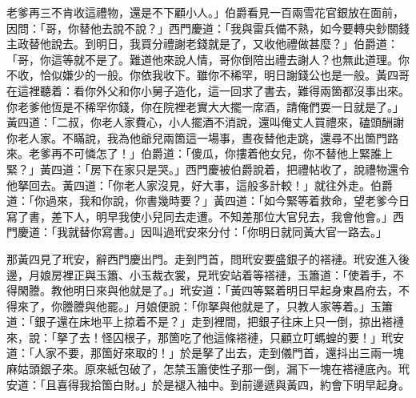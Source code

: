 老爹再三不肯收這禮物，還是不下顧小人。」伯爵看見一百兩雪花官銀放在面前，因問：「哥，你替他去說不說？」西門慶道：「我與雷兵備不熟，如今要轉央鈔關錢主政替他說去。到明日，我買分禮謝老錢就是了，又收他禮做甚麼？」伯爵道：「哥，你這等就不是了。難道他來說人情，哥你倒陪出禮去謝人？也無此道理。你不收，恰似嫌少的一般。你依我收下。雖你不稀罕，明日謝錢公也是一般。黃四哥在這裡聽着：看你外父和你小舅子造化，這一回求了書去，難得兩箇都沒事出來。你老爹他恆是不稀罕你錢，你在院裡老實大大擺一席酒，請俺們耍一日就是了。」{}黃四道：「二叔，你老人家費心，小人擺酒不消說，還叫俺丈人買禮來，磕頭酬謝你老人家。不瞞說，我為他爺兒兩箇這一場事，晝夜替他走跳，還尋不出箇門路來。老爹再不可憐怎了！」伯爵道：「傻瓜，你摟着他女兒，你不替他上緊誰上緊？」{}黃四道：「房下在家只是哭。」西門慶被伯爵說着，把禮帖收了，說禮物還令他拏回去。{}黃四道：「你老人家沒見，好大事，這般多計較！」就往外走。伯爵道：「你過來，我和你說，你書幾時要？」黃四道：「如今緊等着救命，望老爹今日寫了書，差下人，明早我使小兒同去走遭。不知差那位大官兒去，我會他會。」西門慶道：「我就替你寫書。」因叫過玳安來分付：「你明日就同黃大官一路去。」

那黃四見了玳安，辭西門慶出門。走到門首，問玳安要盛銀子的褡褳。玳安進入後邊，月娘房裡正與玉簫、小玉裁衣裳，見玳安站着等褡褳，玉簫道：「使着手，不得閑謄。教他明日來與他就是了。」玳安道：「黃四等緊着明日早起身東昌府去，不得來了，你謄謄與他罷。」月娘便說：「你拏與他就是了，只教人家等着。」玉簫道：「銀子還在床地平上掠着不是？」走到裡間，把銀子往床上只一倒，掠出褡褳來，說：「拏了去！怪囚根子，那箇吃了他這條褡褳，只顧立叮螞蝗的要！」玳安道：「人家不要，那箇好來取的！」於是拏了出去，走到儀門首，還抖出三兩一塊麻姑頭銀子來。{}原來紙包破了，怎禁玉簫使性子那一倒，漏下一塊在褡褳底內。玳安道：「且喜得我拾箇白財。」於是褪入袖中。{}到前邊遞與黃四，約會下明早起身。

